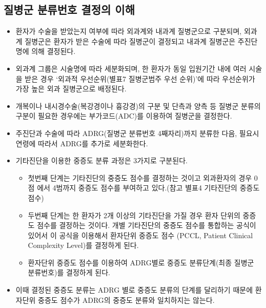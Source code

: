 \subsection{질병군 분류번호 결정의 이해}
\begin{itemize}\tightlist
\item 환자가 수술을 받았는지 여부에 따라 외과계와 내과계 질병군으로 구분되며, 외과계 질병군은 환자가 받은 수술에 따라 질병군이 결정되고 내과계 질병군은 주진단명에 의해 결정된다.
\item 외과계 그룹은 시술명에 따라 세분화되며, 한 환자가 동일 입원기간 내에 여러 시술을 받은 경우 ‘외과적 우선순위(별표7 질병군범주 우선 순위)’에 따라 우선순위가 가장 높은 외과 질병군으로 배정된다.
\item 개복이나 내시경수술(복강경이나 흉강경)의 구분 및 단측과 양측 등 질병군 분류의 구분이 필요한 경우에는 부가코드(ADC)를 이용하여 질병군을 결정한다.
\item 주진단과 수술에 따라 ADRG(질병군 분류번호 4째자리)까지 분류한 다음, 필요시 연령에 따라서 ADRG를 추가로 세분화한다.
\item 기타진단을 이용한 중증도 분류 과정은 3가지로 구분된다. 
	\begin{itemize}\tightlist
	\item 첫번째 단계는 기타진단의 중증도 점수를 결정하는 것이고 외과환자의 경우 0점 에서 4범까지 중증도 점수를 부여하고 있다.(참고 별표4 기타진단의 중증도 점수)
	\item 두번째 단계는 한 환자가 2개 이상의 기타진단을 가질 경우 환자 단위의 중증도 점수를 결정하는 것이다. 개별 기타진단의 중증도 점수를 통합하는 공식이 있어서 이 공식을 이용해서 환자단위 중증도 점수 (PCCL, Patient Clinical Complexity Level)를 결정하게 된다.
	\item 환자단위 중증도 점수를 이용하여 ADRG별로 중증도 분류단계(최종 질병군 분류번호)를 결정하게 된다. 
	\end{itemize}
\item 이때 결정된 중증도 분류는 ADRG 별로 중증도 분류의 단계를 달리하기 때문에 환자단위 중증도 점수가 ADRG의 중증도 분류와 일치하지는 않는다.
\end{itemize}
\prezi{\clearpage}
\par
\medskip
